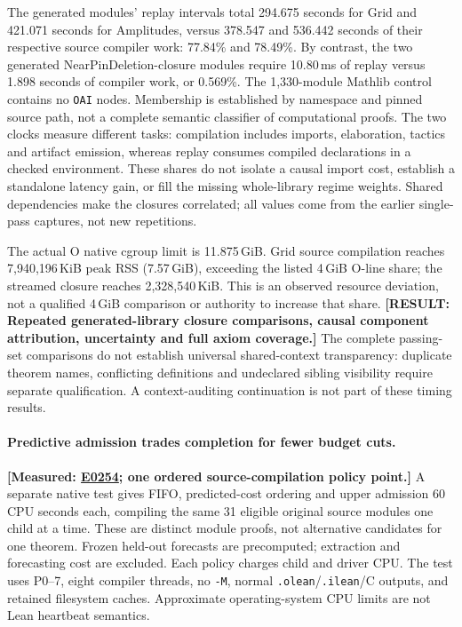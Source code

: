 \documentclass[10pt,twocolumn]{article}
\newcommand{\missing}[1]{\textbf{[RESULT: #1]}}
\newcommand{\measured}[1]{\textbf{[Measured: #1]}}
\newcommand{\expref}[2]{\href{https://github.com/yunwei37/proofserve/blob/main/docs/tmp/build-and-evaluate/step-#1/step-report.md}{E#2}}
\begin{document}
The generated modules' replay intervals total 294.675 seconds for Grid
and 421.071 seconds for Amplitudes, versus 378.547 and 536.442 seconds
of their respective source compiler work: 77.84\% and 78.49\%.
By contrast, the two generated NearPinDeletion-closure modules require
10.80\,ms of replay versus 1.898 seconds of compiler work, or 0.569\%.
The 1,330-module Mathlib control contains no \texttt{OAI} nodes.
Membership is established by namespace and pinned source path, not a
complete semantic classifier of computational proofs.
The two clocks measure different tasks: compilation includes imports,
elaboration, tactics and artifact emission, whereas replay consumes
compiled declarations in a checked environment.
These shares do not isolate a causal import cost, establish a standalone
latency gain, or fill the missing whole-library regime weights.
Shared dependencies make the closures correlated; all values come from
the earlier single-pass captures, not new repetitions.

The actual O native cgroup limit is 11.875\,GiB.
Grid source compilation reaches 7,940,196\,KiB peak RSS (7.57\,GiB),
exceeding the listed 4\,GiB O-line share; the streamed closure reaches
2,328,540\,KiB. This is an observed resource deviation, not a qualified
4\,GiB comparison or authority to increase that share.
\missing{Repeated generated-library closure comparisons, causal
component attribution, uncertainty and full axiom coverage.}
The complete passing-set comparisons do not establish universal shared-context
transparency: duplicate theorem names, conflicting definitions and undeclared
sibling visibility require separate qualification.
A context-auditing continuation is not part of these timing results.

\paragraph{Predictive admission trades completion for fewer budget cuts.}
\measured{\expref{0254-20261101T195608+0000}{0254}; one ordered source-compilation policy point.}
A separate native test gives FIFO, predicted-cost ordering and upper admission
60 CPU seconds each, compiling the same 31 eligible original source modules
one child at a time. These are distinct module proofs, not alternative
candidates for one theorem.
Frozen held-out forecasts are precomputed; extraction and forecasting cost
are excluded. Each policy charges child and driver CPU.
The test uses P0--7, eight compiler threads, no \texttt{-M}, normal
\texttt{.olean}/\texttt{.ilean}/C outputs, and retained filesystem caches.
Approximate operating-system CPU limits are not Lean heartbeat semantics.
\end{document}

